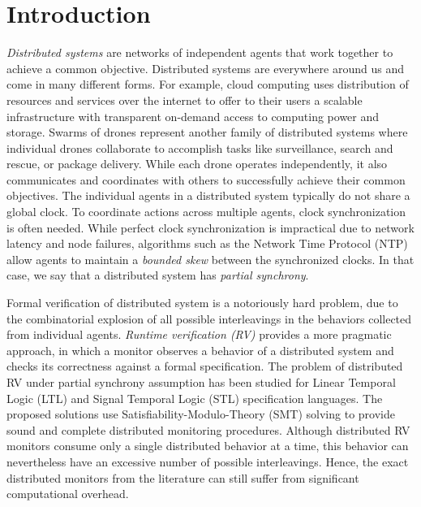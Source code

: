 \section{Introduction} \label{sec:introduction}


\emph{Distributed systems} are networks of independent agents that work together to achieve a common objective. Distributed systems are everywhere around us and come in many different forms. For example, cloud computing uses distribution of resources and services over the internet to offer to their users a scalable infrastructure with transparent on-demand access to computing power and storage. Swarms of drones represent another family of distributed systems where individual drones collaborate  to accomplish tasks like surveillance, search and rescue, or package delivery. While each drone operates independently,  it also communicates and coordinates with others to successfully achieve their common objectives. The individual agents in a distributed system typically do not share a global clock. To coordinate actions across multiple agents, clock synchronization is often needed. While perfect clock synchronization is impractical due to network latency and node failures, algorithms such as the Network Time Protocol (NTP) allow agents to maintain a \emph{bounded skew} between the synchronized clocks. In that case, we say that a distributed system has \emph{partial synchrony}. 

Formal verification of distributed system is a notoriously hard problem, due to the combinatorial explosion of all possible interleavings in the behaviors collected from individual agents. \emph{Runtime verification (RV)} provides a more pragmatic approach, in which a monitor observes a behavior of a distributed system and checks its correctness against a formal specification. The problem of distributed RV under partial synchrony assumption has been studied for Linear Temporal Logic (LTL) and Signal Temporal Logic (STL) specification languages. The proposed solutions use Satisfiability-Modulo-Theory (SMT) solving to provide sound and complete distributed monitoring procedures. Although distributed RV monitors consume only a single distributed behavior at a time, this behavior can nevertheless have an excessive number of possible interleavings. Hence, the exact distributed monitors from the literature can still suffer from significant computational overhead. 


